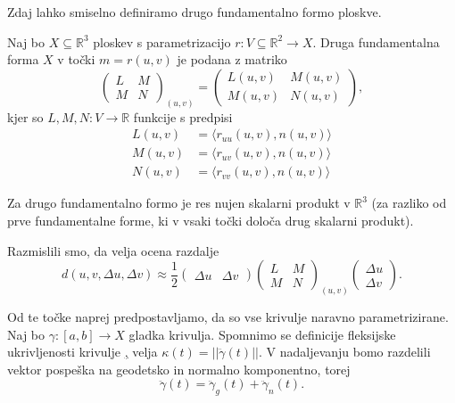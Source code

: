 Zdaj lahko smiselno definiramo drugo fundamentalno formo ploskve.

\begin{definicija}
\label{def_druga_fundamentalna_forma_ploskve}
 Naj bo $X \subseteq \mathbb{R}^3$ ploskev s parametrizacijo $r: V \subseteq \mathbb{R}^2 \to  X$. Druga fundamentalna forma $X$ v točki $m = r(u,v)$ je podana z matriko 
 \begin{equation*} \begin{pmatrix}
 L & M \\
 M & N
 \end{pmatrix}_{(u,v)} = \begin{pmatrix}
 L(u,v) & M(u,v) \\
 M(u,v) & N(u,v)
 \end{pmatrix}, \end{equation*}
 kjer so $L, M, N: V \to  \mathbb{R}$ funkcije s predpisi 
 \begin{align*}
    L(u,v)  &= \langle r_{uu}(u,v), n(u,v) \rangle  \\
    M(u,v)  &= \langle r_{uv}(u,v), n(u,v) \rangle  \\
    N(u,v)  &= \langle r_{vv}(u,v), n(u,v) \rangle  
 \end{align*}

\end{definicija}

\begin{opomba}
    Za drugo fundamentalno formo je res nujen skalarni produkt v $\mathbb{R}^3$ (za razliko od prve fundamentalne forme, ki v vsaki točki določa drug skalarni produkt). 
\end{opomba}

Razmislili smo, da velja ocena razdalje
\begin{equation*} d(u, v, \Delta u, \Delta v) \approx \frac{1}{2} \begin{pmatrix}
  \Delta u  &  \Delta v 
\end{pmatrix} \begin{pmatrix}
  L & M \\
  M & N
\end{pmatrix}_{(u,v)}  
\begin{pmatrix}
  \Delta u \\
  \Delta v 
\end{pmatrix}.\end{equation*}

Od te točke naprej predpostavljamo, da so vse krivulje naravno parametrizirane. Naj bo $\gamma: [a,b] \to X$ gladka krivulja. 
Spomnimo se definicije fleksijske ukrivljenosti krivulje \href{def_fleksijska_ukrivljenost}, velja $\kappa(t) = \lvert\lvert \ddot{\gamma}(t) \rvert\rvert$.
V nadaljevanju bomo razdelili vektor pospeška na geodetsko in normalno komponentno, torej 
\begin{equation*} \ddot{\gamma}(t) = \ddot{\gamma}_g(t) + \ddot{\gamma}_n(t).\end{equation*}

